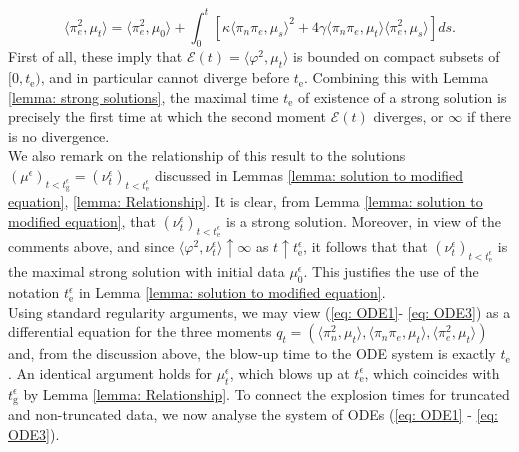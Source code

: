 \begin{equation} \label{eq: ODE3}
    \langle \pi_e^2, \mu_t\rangle =
    \langle \pi_e^2, \mu_0\rangle + \int_0^t \left[\kappa\langle \pi_n\pi_e, \mu_s\rangle^2+4\gamma\langle \pi_n\pi_e, \mu_t\rangle\langle\pi_e^2, \mu_s \rangle \right] ds.
\end{equation} First of all, these imply that $\mathcal{E}(t)=\langle \varphi^2, \mu_t\rangle$ is bounded on compact subsets of $[0, t_\mathrm{e})$, and in particular cannot diverge before $t_\mathrm{e}$. Combining this with Lemma \ref{lemma: strong solutions}, the maximal time $t_\mathrm{e}$ of existence of a strong solution is precisely the first time at which the second moment $\mathcal{E}(t)$ diverges, or $\infty$ if there is no divergence. \medskip \\ We also remark on the relationship of this result to the solutions $(\mu^\epsilon)_{t<t_\mathrm{g}^\epsilon}=(\nu^\epsilon_t)_{t<t_\mathrm{e}^\epsilon}$ discussed in Lemmas \ref{lemma: solution to modified equation}, \ref{lemma: Relationship}. It is clear, from Lemma \ref{lemma: solution to modified equation}, that $(\nu^\epsilon_t)_{t<t_\mathrm{e}^\epsilon}$ is a strong solution. Moreover, in view of the comments above, and since $\langle \varphi^2, \nu^\epsilon_t\rangle \uparrow \infty$ as $t\uparrow t_\mathrm{e}^\epsilon$, it follows that that $(\nu^{\epsilon}_t)_{t<t_\mathrm{e}^\epsilon}$ is the maximal strong solution with initial data $\mu^\epsilon_0.$ This justifies the use of the notation $t^\epsilon_\mathrm{e}$ in Lemma \ref{lemma: solution to modified equation}. \medskip \\  Using standard regularity arguments, we may view (\ref{eq: ODE1}- \ref{eq: ODE3}) as a differential equation for the three moments $q_t=(\langle \pi_n^2, \mu_t\rangle, \langle \pi_n \pi_e, \mu_t\rangle, \langle \pi_e^2, \mu_t\rangle)$ and, from the discussion above, the blow-up time to the ODE system is exactly $t_\mathrm{e}$. An identical argument holds for $\mu^\epsilon_t$, which blows up at $t^\epsilon_\mathrm{e}$, which coincides with  $t^\epsilon_\mathrm{g}$ by Lemma \ref{lemma: Relationship}. To connect the explosion times for truncated and non-truncated data, we now analyse the system of ODEs (\ref{eq: ODE1} - \ref{eq: ODE3}). 
